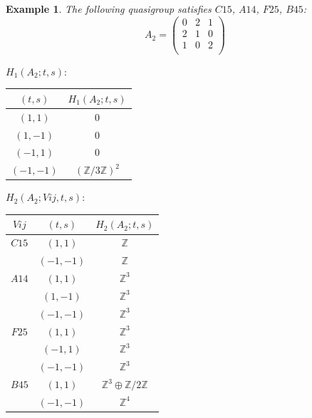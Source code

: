 \documentclass[11pt]{amsart}
\newtheorem{example}[theorem]{Example}
\theoremstyle{definition}
\newcommand{\Z}{\mathbb{Z}}
\begin{document}
\begin{example}
The following quasigroup satisfies 
$C15$, $A14$, $F25$, $B45$:
   \[ A_2 = \left(
\begin{array}{ccc}
 0 & 2 & 1 \\
 2 & 1 & 0 \\
 1 & 0 & 2 \\
\end{array}
\right) \]



\bigskip


$H_1(A_2;t,s):$

\begin{center}
    
\begin{tabular}{c|c}
    $(t,s)$ & $H_1(A_2;t,s)$  \\
    \hline
    $(1,1)$ & $0$ \\
    $(1,-1)$ & $0$ \\
    $(-1,1)$ & $0$ \\
    $(-1,-1)$ & $(\Z/3\Z)^2$ \\
\end{tabular}
\end{center}
\bigskip

$H_2(A_2;Vij,t,s):$

\begin{center}
    
\begin{tabular}{c|c|c}
    $Vij$ & $(t,s)$ & $H_2(A_2;t,s)$  \\
    \hline

    $C15$ & $(1,1)$ & $\Z$ \\
        & $(-1,-1)$ & $\Z$ \\
    $A14$ & $(1,1)$ & $\Z^3$ \\
        & $(1,-1)$ & $\Z^3$ \\
        & $(-1,-1)$ & $\Z^3$ \\
    $F25$ & $(1,1)$ & $\Z^3$ \\
        & $(-1,1)$ & $\Z^3$ \\
        & $(-1,-1)$ & $\Z^3$ \\
    $B45$ & $(1,1)$ & $\Z^3 \oplus \Z/2\Z$ \\
        & $(-1,-1)$ & $\Z^4$ \\
\end{tabular}

\end{center}

\end{example}
\end{document}
